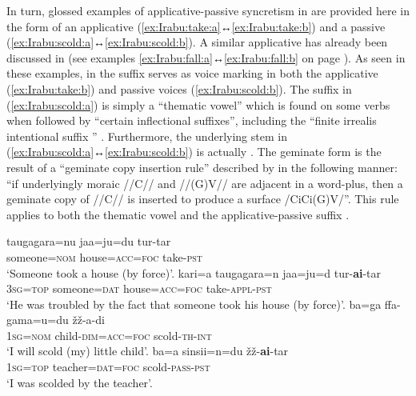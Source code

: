 In turn, glossed examples of applicative-passive syncretism in  are provided here in the form of an applicative  (\ref{ex:Irabu:take:a}↔\ref{ex:Irabu:take:b}) and a passive  (\ref{ex:Irabu:scold:a}↔\ref{ex:Irabu:scold:b}). A similar applicative  has already been discussed in  (see examples \ref{ex:Irabu:fall:a}↔\ref{ex:Irabu:fall:b} on page \pageref{ex:Irabu:fall:a}). As seen in these examples, in  the suffix  serves as voice marking in both the applicative (\ref{ex:Irabu:take:b}) and passive voices (\ref{ex:Irabu:scold:b}). The suffix  in (\ref{ex:Irabu:scold:a}) is simply a “thematic vowel” which is found on some verbs when followed by “certain inflectional suffixes”, including the “finite irrealis intentional suffix ” \citep[260f.]{shimoji:2008}. Furthermore, the underlying stem in (\ref{ex:Irabu:scold:a}↔\ref{ex:Irabu:scold:b}) is actually . The geminate form  is the result of a “geminate copy insertion rule” described by \citet[69]{shimoji:2008} in the following manner: “if underlyingly moraic //C// and //(G)V// are adjacent in a word-plus, then a geminate copy of //C// is inserted to produce a surface /CiCi(G)V/”. This rule applies to both the thematic vowel  and the applicative-passive suffix  \citep[70, 297]{shimoji:2008}. 

\ea {} \citep[193, 297, 496]{shimoji:2008}
\ea\label{ex:Irabu:take:a}
	\gll	taugagara=nu jaa=ju=du tur-tar \\
			someone=\textsc{nom} house=\textsc{acc=foc} take-\textsc{pst} \\
	\glt	‘Someone took a house (by force)’.
\ex\label{ex:Irabu:take:b}
	\gll	kari=a taugagara=n jaa=ju=d tur-\textbf{ai}-tar \\
			\textsc{3sg=top} someone=\textsc{dat} house=\textsc{acc=foc} take-\textsc{appl-pst} \\
	\glt	‘He was troubled by the fact that someone took his house (by force)’.
\ex\label{ex:Irabu:scold:a}
	\gll	ba=ga ffa-gama=u=du žž-a-di \\
			\textsc{1sg=nom} child-\textsc{dim=acc=foc} scold-\textsc{th-int} \\
	\glt	‘I will scold (my) little child’.
\ex\label{ex:Irabu:scold:b}
	\gll	ba=a sinsii=n=du žž-\textbf{ai}-tar \\
			\textsc{1sg=top} teacher=\textsc{dat=foc} scold-\textsc{pass-pst} \\
	\glt	‘I was scolded by the teacher’.
	\z 
\z

